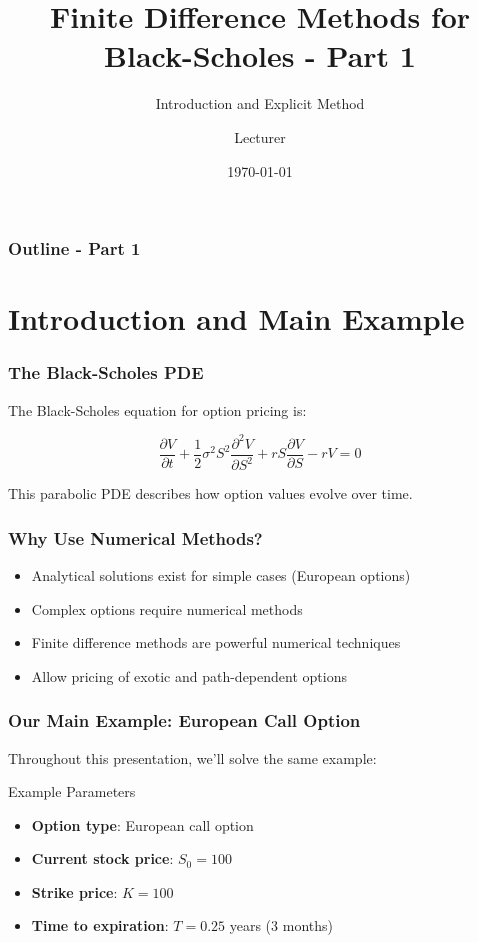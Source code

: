 \documentclass[aspectratio=169]{beamer}
\title{Finite Difference Methods for Black-Scholes - Part 1}
\subtitle{Introduction and Explicit Method}
\author{Lecturer}
\date{\today}
\begin{document}
\begin{frame}
\titlepage
\end{frame}

\begin{frame}
\frametitle{Outline - Part 1}
\tableofcontents
\end{frame}

\section{Introduction and Main Example}

\begin{frame}
\frametitle{The Black-Scholes PDE}
The Black-Scholes equation for option pricing is:

\[\frac{\partial V}{\partial t} + \frac{1}{2}\sigma^2 S^2 \frac{\partial^2 V}{\partial S^2} + rS \frac{\partial V}{\partial S} - rV = 0\]

This parabolic PDE describes how option values evolve over time.
\end{frame}

\begin{frame}
\frametitle{Why Use Numerical Methods?}
\begin{itemize}
\item Analytical solutions exist for simple cases (European options)
\item Complex options require numerical methods
\item Finite difference methods are powerful numerical techniques
\item Allow pricing of exotic and path-dependent options
\end{itemize}
\end{frame}

\begin{frame}
\frametitle{Our Main Example: European Call Option}
Throughout this presentation, we'll solve the same example:

\begin{block}{Example Parameters}
\begin{itemize}
\item \textbf{Option type}: European call option
\item \textbf{Current stock price}: \(S_0 = 100\)
\item \textbf{Strike price}: \(K = 100\)
\item \textbf{Time to expiration}: \(T = 0.25\) years (3 months)
\end{itemize}
\end{block}
\end{frame}
\end{document}
